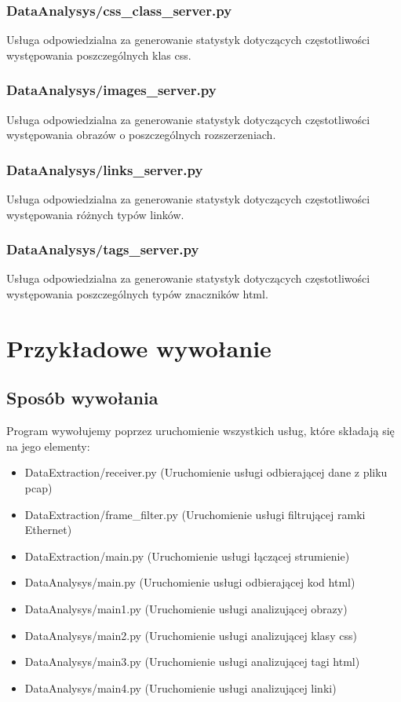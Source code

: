 \documentclass[12pt]{article}
\begin{document}
\subsubsection{DataAnalysys/css\_class\_server.py} 
Usługa odpowiedzialna za generowanie statystyk dotyczących częstotliwości występowania poszczególnych klas css.

\subsubsection{DataAnalysys/images\_server.py} 
Usługa odpowiedzialna za generowanie statystyk dotyczących częstotliwości występowania obrazów o poszczególnych rozszerzeniach.

\subsubsection{DataAnalysys/links\_server.py} 
Usługa odpowiedzialna za generowanie statystyk dotyczących częstotliwości występowania różnych typów linków.

\subsubsection{DataAnalysys/tags\_server.py} 
Usługa odpowiedzialna za generowanie statystyk dotyczących częstotliwości występowania poszczególnych typów znaczników html.


\section{Przykładowe wywołanie}
\subsection{Sposób wywołania}
Program wywołujemy poprzez uruchomienie wszystkich usług, które składają się na jego elementy:
\begin{itemize}
\item DataExtraction/receiver.py (Uruchomienie usługi odbierającej dane z pliku pcap)
\item DataExtraction/frame\_filter.py (Uruchomienie usługi filtrującej ramki Ethernet)
\item DataExtraction/main.py (Uruchomienie usługi łączącej strumienie)
\item DataAnalysys/main.py (Uruchomienie usługi odbierającej kod html)
\item DataAnalysys/main1.py (Uruchomienie usługi analizującej obrazy)
\item DataAnalysys/main2.py (Uruchomienie usługi analizującej klasy css)
\item DataAnalysys/main3.py (Uruchomienie usługi analizującej tagi html)
\item DataAnalysys/main4.py (Uruchomienie usługi analizującej linki)
\end{itemize}
\end{document}
